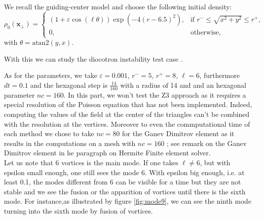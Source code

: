 \documentclass[proc]{edpsmath}
\begin{document}
%
%

We recall the guiding-center model and choose the following initial density:
\begin{equation*}
 \rho_0(\mathbf{x}_\bot)=
 \left\{
 \begin{array}{ll}
  (1+\varepsilon\cos(\ell\theta))\exp{(-4(r-6.5)^2)},&\text{if  } r^-\leq\sqrt{x^2+y^2}\leq r^+,\\[3mm]
  0,&\text{otherwise},
 \end{array}
 \right.
\end{equation*}
with $\theta=\text{atan2}(y,x)$.

With this we can study the diocotron instability test case \cite{madaule:hal-00841504}.

\noindent As for the parameters, we take $\varepsilon=0.001$, $r^-=5$, $r^+=8$, $\ell=6$, furthermore $dt=0.1$ and the hexagonal step is $\frac{14}{160}$ with a radius of 14 and and an hexagonal parameter $nc =160$.
In this part, we won't test the Z3 approach as it requires a special resolution of the Poisson equation that has not been implemented. Indeed, computing the values of the field at the center of the triangles can't be combined with the resolution at the vertices. 
Moreover to even the commputational time of each method we chose to take $nc=80$ for the Ganev Dimitrov element as it results in the computations on a mesh with $nc =160$ ; see remark on the Ganev Dimitrov element in he paragraph on Hermite Finite element solver.\\
Let us note that 6 vortices is the main mode. If one takes $\ell\neq6$, but with epsilon small enough, one still sees the mode 6. With epsilon big enough, i.e. at least 0.1, the modes different from 6 can be visible for a time but they are not stable and we see the fusion or the apparition of vortices until there is the sixth mode. For instance,as illustrated by figure \ref{fig:mode9}, we can see the ninth mode turning into the sixth mode by fusion of vortices.
\end{document}
